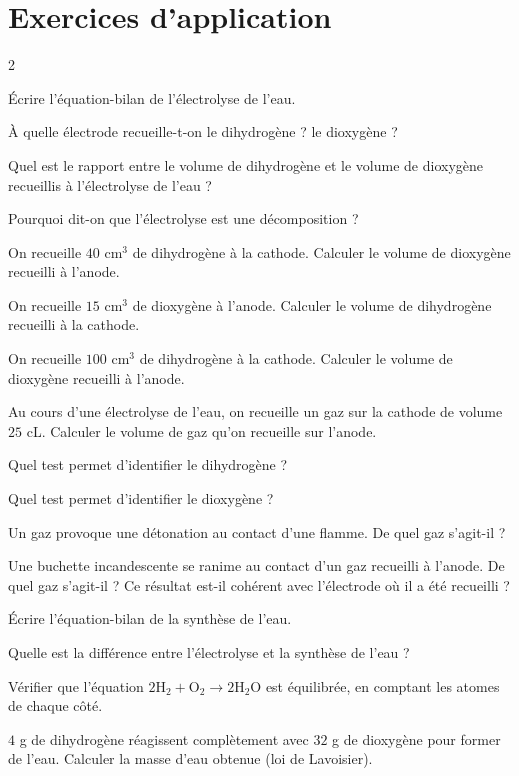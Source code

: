 \section{Exercices d'application}
\begin{multicols}{2}

\exo{} Écrire l'équation-bilan de l'électrolyse de l'eau.

\exo{} À quelle électrode recueille-t-on le dihydrogène ? le dioxygène ?

\exo{} Quel est le rapport entre le volume de dihydrogène et le volume de
dioxygène recueillis à l'électrolyse de l'eau ?

\exo{} Pourquoi dit-on que l'électrolyse est une décomposition ?

\exo{} On recueille $40$ cm$^{3}$ de dihydrogène à la cathode. Calculer le volume
de dioxygène recueilli à l'anode.

\exo{} On recueille $15$ cm$^{3}$ de dioxygène à l'anode. Calculer le volume de
dihydrogène recueilli à la cathode.

\exo{} On recueille $100$ cm$^{3}$ de dihydrogène à la cathode. Calculer le
volume de dioxygène recueilli à l'anode.

\exo{} Au cours d'une électrolyse de l'eau, on recueille un gaz sur la cathode de
volume $25$ cL. Calculer le volume de gaz qu'on recueille sur l'anode.

\exo{} Quel test permet d'identifier le dihydrogène ?

\exo{} Quel test permet d'identifier le dioxygène ?

\exo{} Un gaz provoque une détonation au contact d'une flamme. De quel gaz
s'agit-il ?

\exo{} Une buchette incandescente se ranime au contact d'un gaz recueilli à
l'anode. De quel gaz s'agit-il ? Ce résultat est-il cohérent avec l'électrode où il a été
recueilli ?

\exo{} Écrire l'équation-bilan de la synthèse de l'eau.

\exo{} Quelle est la différence entre l'électrolyse et la synthèse de l'eau ?

\exo{} Vérifier que l'équation $2\mathrm{H_2}+\mathrm{O_2}\to2\mathrm{H_2O}$ est
équilibrée, en comptant les atomes de chaque côté.

\exo{} $4$ g de dihydrogène réagissent complètement avec $32$ g de dioxygène pour
former de l'eau. Calculer la masse d'eau obtenue (loi de Lavoisier).

\end{multicols}

